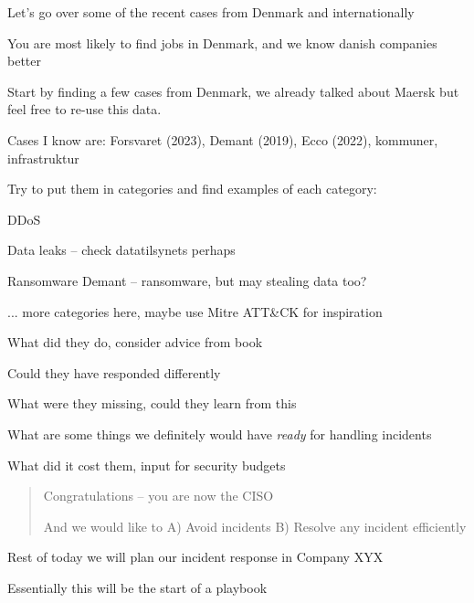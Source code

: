 \documentclass[Screen16to9,17pt]{foils}
\begin{document}


Let's go over some of the recent cases from Denmark and internationally

You are most likely to find jobs in Denmark, and we know danish companies better


Start by finding a few cases from Denmark, we already talked about Maersk but feel free to re-use this data.

Cases I know are: Forsvaret (2023), Demant (2019), Ecco (2022), kommuner, infrastruktur

Try to put them in categories and find examples of each category:
\begin{list2}
\item DDoS
\item Data leaks -- check datatilsynets perhaps
\item Ransomware Demant -- ransomware, but may stealing data too?
\item ... more categories here, maybe use Mitre ATT\&CK for inspiration
\end{list2}


\begin{list2}
\item What did they do, consider advice from book
\item Could they have responded differently
\item What were they missing, could they learn from this
\item What are some things we definitely would have \emph{ready} for handling incidents
\item What did it cost them, input for security budgets
\end{list2}




\begin{quote}
Congratulations -- you are now the CISO

And we would like to A) Avoid incidents B) Resolve any incident efficiently
\end{quote}

\begin{list2}
\item Rest of today we will plan our incident response in Company XYX
\item Essentially this will be the start of a playbook
\end{list2}
\end{document}
